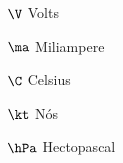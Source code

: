 
\begin{simbolos}
  \item[$ \V $] Volts
  \item[$ \ma $] Miliampere 
  \item[$ \C $] Celsius
  \item[$ \kt $] Nós
  \item[$ \hPa $] Hectopascal
\end{simbolos}